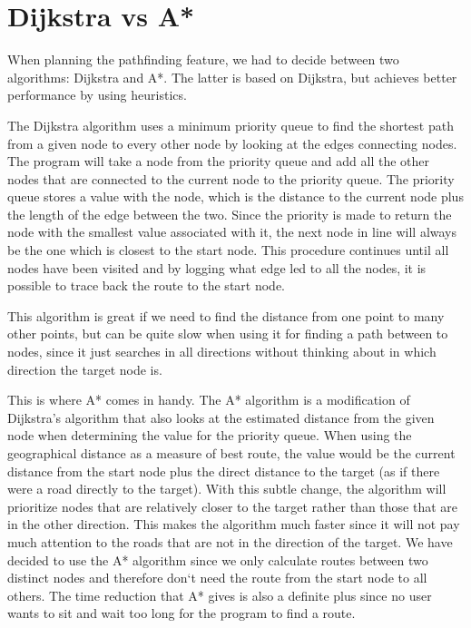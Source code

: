 \section{Dijkstra vs A*}
\label{IMPL-DVA}
When planning the pathfinding feature, we had to decide between two algorithms:
Dijkstra and A*. The latter is based on Dijkstra, but achieves better performance by
using heuristics.

The Dijkstra algorithm uses a minimum priority queue to find the shortest path
from a given node to every other node by looking at the edges connecting nodes.
The program will take a node from the priority queue and add all the other nodes
that are connected to the current node to the priority queue. The priority queue
stores a value with the node, which is the distance to the current node
plus the length of the edge between the two. Since the priority is made to return
the node with the smallest value associated with it, the next node in line will
always be the one which is closest to the start node. This procedure continues
until all nodes have been visited and by logging what edge led to all the nodes,
it is possible to trace back the route to the start node.

This algorithm is great if we need to find the distance from one point to many other
points, but can be quite slow when using it for finding a path between to nodes,
since it just searches in all directions without thinking about in which direction the
target node is.

This is where A* comes in handy. The A* algorithm is a modification of Dijkstra's
algorithm that also looks at the estimated distance from the given node when
determining the value for the priority queue. When using the geographical distance
as a measure of best route, the value would be the current distance from the start
node plus the direct distance to the target (as if there were a road directly to
the target). With this subtle change, the algorithm will prioritize nodes that are
relatively closer to the target rather than those that are in the other
direction. This makes the algorithm much faster since it will not pay much attention
to the roads that are not in the direction of the target.
We have decided to use the A* algorithm since we only calculate routes between
two distinct nodes and therefore don`t need the route from the start node to all
others. The time reduction that A* gives is also a definite plus since no user
wants to sit and wait too long for the program to find a route.

